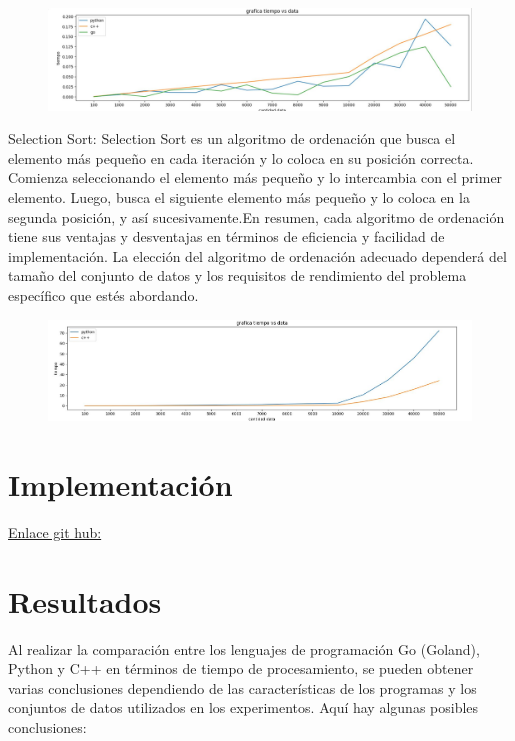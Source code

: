 \begin{figure}[h]
    \centering
    \includegraphics[scale=0.3]{images/3.JPG}
    \label{fig:imagen}
\end{figure}

Selection Sort:
Selection Sort es un algoritmo de ordenación que busca el elemento más pequeño en cada iteración y lo coloca en su posición correcta. Comienza seleccionando el elemento más pequeño y lo intercambia con el primer elemento. Luego, busca el siguiente elemento más pequeño y lo coloca en la segunda posición, y así sucesivamente.En resumen, cada algoritmo de ordenación tiene sus ventajas y desventajas en términos de eficiencia y facilidad de implementación. La elección del algoritmo de ordenación adecuado dependerá del tamaño del conjunto de datos y los requisitos de rendimiento del problema específico que estés abordando.

\begin{figure}[h]
    \centering
    \includegraphics[scale=0.4]{images/4.JPG}
    \label{fig:imagen}
\end{figure}

\section{Implementación}

\href{https://github.com/jhoel-choque/practica_1.git}{Enlace git hub:}

\section{Resultados}
Al realizar la comparación entre los lenguajes de programación Go (Goland), Python y C++ en términos de tiempo de procesamiento, se pueden obtener varias conclusiones dependiendo de las características de los programas y los conjuntos de datos utilizados en los experimentos. Aquí hay algunas posibles conclusiones:

